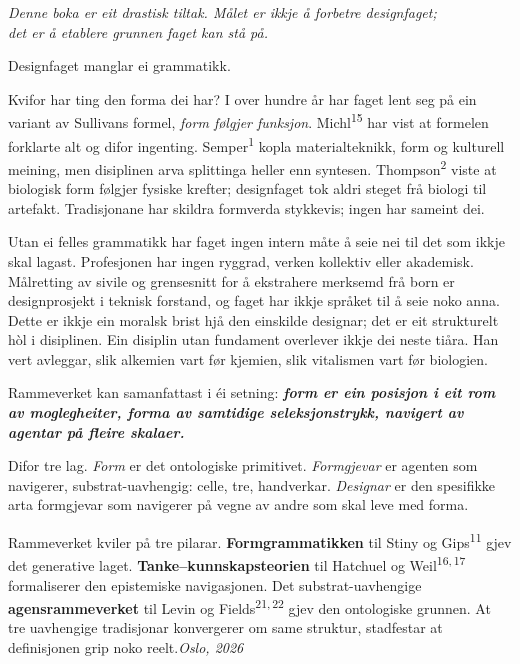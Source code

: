\begin{widebody}
\begin{foreordbody}

\begin{center}\itshape
Denne boka er eit drastisk tiltak. Målet er ikkje å forbetre designfaget;\\ det er å etablere grunnen faget kan stå på.
\end{center}

Designfaget manglar ei grammatikk.

Kvifor har ting den forma dei har? I over hundre år har faget lent seg på ein variant av Sullivans formel, \textit{form følgjer funksjon}. Michl\textsuperscript{15} har vist at formelen forklarte alt og difor ingenting. Semper\textsuperscript{1} kopla materialteknikk, form og kulturell meining, men disiplinen arva splittinga heller enn syntesen. Thompson\textsuperscript{2} viste at biologisk form følgjer fysiske krefter; designfaget tok aldri steget frå biologi til artefakt. Tradisjonane har skildra formverda stykkevis; ingen har sameint dei.

Utan ei felles grammatikk har faget ingen intern måte å seie nei til det som ikkje skal lagast. Profesjonen har ingen ryggrad, verken kollektiv eller akademisk. Målretting av sivile og grensesnitt for å ekstrahere merksemd frå born er designprosjekt i teknisk forstand, og faget har ikkje språket til å seie noko anna. Dette er ikkje ein moralsk brist hjå den einskilde designar; det er eit strukturelt hòl i disiplinen. Ein disiplin utan fundament overlever ikkje dei neste tiåra. Han vert avleggar, slik alkemien vart før kjemien, slik vitalismen vart før biologien.

Rammeverket kan samanfattast i éi setning: \textbf{\textit{form er ein posisjon i eit rom av moglegheiter, forma av samtidige seleksjonstrykk, navigert av agentar på fleire skalaer.}}

Difor tre lag. \textit{Form} er det ontologiske primitivet. \textit{Formgjevar} er agenten som navigerer, substrat-uavhengig: celle, tre, handverkar. \textit{Designar} er den spesifikke arta formgjevar som navigerer på vegne av andre som skal leve med forma.

Rammeverket kviler på tre pilarar. \textbf{Formgrammatikken} til Stiny og Gips\textsuperscript{11} gjev det generative laget. \textbf{Tanke--kunnskapsteorien} til Hatchuel og Weil\textsuperscript{16,\,17} formaliserer den epistemiske navigasjonen. Det substrat-uavhengige \textbf{agensrammeverket} til Levin og Fields\textsuperscript{21,\,22} gjev den ontologiske grunnen. At tre uavhengige tradisjonar konvergerer om same struktur, stadfestar at definisjonen grip noko reelt.\hfill\textit{Oslo, 2026}
\end{foreordbody}
\end{widebody}
